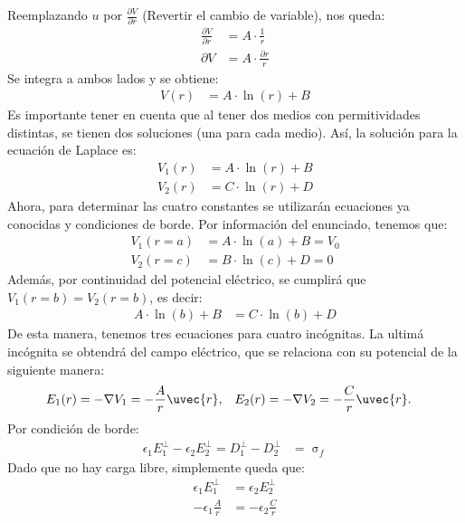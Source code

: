 \documentclass[
  11pt,
  letterpaper,
   answers
  ]{exam}
\begin{document}
\begin{questions}
\begin{solution}
\begin{parts}
    Reemplazando $u$ por $\frac{\partial V}{\partial r}$ (Revertir el cambio de variable), nos queda:
    \begin{align}
        \frac{\partial V}{\partial r} &= A \cdot \frac{1}{r} \\
        \partial V &= A \cdot \frac{\partial r}{r}
    \end{align}
    Se integra a ambos lados y se obtiene:
    \begin{align}
        V(r) &= A \cdot \ln{(r)} + B
    \end{align}
    Es importante tener en cuenta que al tener dos medios con permitividades distintas, se tienen dos soluciones (una para cada medio). Así, la solución para la ecuación de Laplace es: 
    \begin{align}
        V_1(r) &= A \cdot \ln{(r)} + B \\
        V_2(r) &= C \cdot \ln{(r)} + D
    \end{align}
    Ahora, para determinar las cuatro constantes se utilizarán ecuaciones ya conocidas y condiciones de borde. Por información del enunciado, tenemos que:
    \begin{align}
        V_1(r=a) &= A \cdot \ln{(a)} + B = V_0 \\
        V_2(r=c) &= B \cdot \ln{(c)} + D = 0
    \end{align}
    Además, por continuidad del potencial eléctrico, se cumplirá que $V_1(r=b) = V_2(r=b)$, es decir:
    \begin{align}
        A \cdot \ln{(b)} + B &= C \cdot \ln{(b)} + D
    \end{align}
    De esta manera, tenemos tres ecuaciones para cuatro incógnitas. La ultimá incógnita se obtendrá del campo eléctrico, que se relaciona con su potencial de la siguiente manera:
    \begin{align}
        E_{1}(r) &= -\nabla V_{1}=-\frac{A}{r} \uvec{r},   &  E_{2}(r) &= -\nabla V_{2}=-\frac{C}{r} \uvec{r}.
    \end{align}
    Por condición de borde:
    \begin{align}
        \epsilon_1 E^\bot_{1} - \epsilon_2 E^\bot_{2}
        =  D^\bot_{1} - D^\bot_{2} &= \upsigma_f
    \end{align}
    Dado que no hay carga libre, simplemente queda que:
    \begin{align}
        \epsilon_1 E^\bot_{1} &= \epsilon_2 E^\bot_{2} \\
        -\epsilon_1 \frac{A}{r} &= -\epsilon_2 \frac{C}{r} \\

\end{align}
\end{parts}
\end{solution}
\end{questions}
\end{document}
